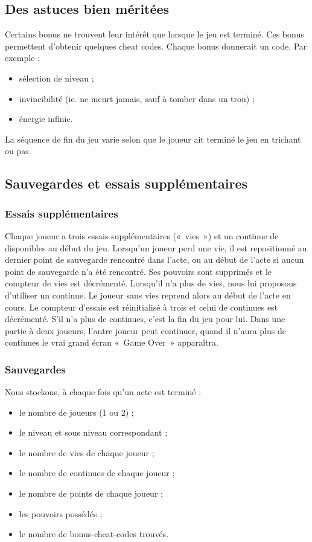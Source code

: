 \documentclass{article}
\begin{document}
\subsection{Des astuces bien méritées}
Certains bonus ne trouvent leur intérêt que lorsque le jeu est
terminé. Ces bonus permettent d'obtenir quelques cheat codes. Chaque
bonus donnerait un code. Par exemple :
\begin{itemize}
\item sélection de niveau ;
\item invincibilité (ie. ne meurt jamais, sauf à tomber dans un
      trou) ;
\item énergie infinie.
\end{itemize}
La séquence de fin du jeu varie selon que le joueur ait terminé le jeu
en trichant ou pas.

\subsection{Sauvegardes et essais supplémentaires}

\subsubsection{Essais supplémentaires}
Chaque joueur a trois essais supplémentaires («~vies~») et un continue
de disponibles au début du jeu. Lorsqu'un joueur perd une vie, il est
repositionné au dernier point de sauvegarde rencontré dans l'acte, ou
au début de l'acte si aucun point de sauvegarde n'a été
rencontré. Ses pouvoirs sont supprimés et le compteur de vies est
décrémenté. Lorsqu'il n'a plus de vies, nous lui proposons d'utiliser
un continue. Le joueur sans vies reprend alors au début de l'acte en
cours. Le compteur d'essais est réinitialisé à trois et celui de
continues est décrémenté. S'il n'a plus de continues, c'est la fin du
jeu pour lui. Dans une partie à deux joueurs, l'autre joueur peut
continuer, quand il n'aura plus de continues le vrai grand écran
«~Game Over~» apparaîtra.

\subsubsection{Sauvegardes}
Nous stockons, à chaque fois qu'un acte est terminé :
\begin{itemize}
\item le nombre de joueurs (1 ou 2) ;
\item le niveau et sous niveau correspondant ;
\item le nombre de vies de chaque joueur ;
\item le nombre de continues de chaque joueur ;
\item le nombre de points de chaque joueur ;
\item les pouvoirs possédés ;
\item le nombre de bonus-cheat-codes trouvés.
\end{itemize}
\end{document}
